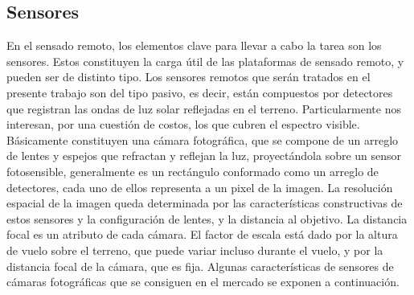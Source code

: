 \subsection{Sensores}
En el sensado remoto, los elementos clave para llevar a cabo la tarea son los sensores. Estos constituyen la carga útil de las plataformas de sensado remoto, y pueden ser de distinto tipo.
Los sensores remotos que serán tratados en el presente trabajo son del tipo pasivo, es decir, están compuestos por detectores que registran las ondas de luz solar reflejadas en el terreno. Particularmente nos interesan, por una cuestión de costos, los que cubren el espectro visible. Básicamente constituyen una cámara fotográfica, que se compone de un arreglo de lentes y espejos que refractan y reflejan la luz, proyectándola sobre un sensor fotosensible, generalmente es un rectángulo conformado como un arreglo de detectores, cada uno de ellos representa a un pixel de la imagen. La resolución espacial de la imagen queda determinada por las características constructivas de estos sensores y la configuración de lentes, y la distancia al objetivo. 
 La distancia focal es un atributo de cada cámara. El factor de escala está dado por la altura de vuelo sobre el terreno, que puede variar incluso durante el vuelo, y por la distancia focal de la cámara, que es fija. 
 Algunas características de sensores de cámaras fotográficas que se consiguen en el mercado se exponen a continuación.


\color{black}

